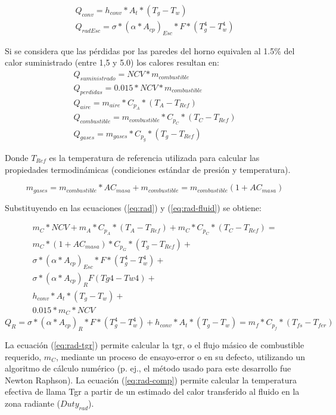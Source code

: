 \begin{gather}
    Q_{conv} = h_{conv} * A_t * (T_g - T_w)\\
    Q_{radEsc} = \sigma * ( \alpha * A_{cp} )_{Esc} * F * ( T_{g}^{4} - T_{w}^{4} )
\end{gather}

\par Si se considera que las pérdidas por las paredes del horno equivalen al 1.5\% del calor suministrado (entre 1,5 y 5.0) los calores resultan en:
\begin{gather}
    Q_{suministrado} = NCV * m_{combustible}\\
    Q_{perdidas} = 0.015 * NCV * m_{combustible}\\
    Q_{aire} = m_{aire} * C_{p_A} * (T_A - T_{Ref})\\
    Q_{combustible} = m_{combustible} * C_{p_C} * (T_C - T_{Ref})\\
    Q_{gases} = m_{gases} * C_{p_g} * (T_g - T_{Ref})
\end{gather}

\par Donde $T_{Ref}$ es la temperatura de referencia utilizada para calcular las propiedades termodinámicas (condiciones estándar de presión y temperatura).

\begin{equation}
    m_{gases} = m_{combustible} * AC_{masa} + m_{combustible} = 
    m_{combustible} (1 + AC_{masa})
\end{equation}

Substituyendo  en las ecuaciones (\ref{eq:rad}) y (\ref{eq:rad-fluid}) se obtiene:

\begin{equation}\label{eq:rad-tgr}
\begin{gathered}
    m_C*NCV +m_A*C_{p_A}*(T_A -T_{Ref}) + m_C*C_{p_C}*(T_C -T_{Ref}) = \\
    m_C*(1 +AC_{masa})*C_{p_G}*(T_g -T_{Ref}) + \\
    \sigma *(\alpha *A_{cp})_{Esc}*F*(T_g^4-T_w^4) + \\
    \sigma *(\alpha *A_{cp})_R F (Tg4 - Tw4) + \\
    h_{conv}*A_t*(T_g -T_w) + \\
    0.015*m_C*NCV
\end{gathered}
\end{equation}
\begin{equation}
\label{eq:rad-comp}
Q_R = 
\sigma * (\alpha * A_{cp})_R *F *(T_g^4 -T_w^4) +h_{conv} *A_t *(T_g -T_w)
= m_f * C_{p_f} * (T_{fs} - T_{fer})
\end{equation}
\par La ecuación (\ref{eq:rad-tgr}) permite calcular la \ac{tgr}, o el flujo másico de combustible requerido, $m_C$, mediante un proceso de ensayo-error o en su defecto, utilizando un algoritmo de cálculo numérico (p. ej., el método usado para este desarrollo fue Newton Raphson). La ecuación (\ref{eq:rad-comp}) permite calcular la  temperatura efectiva de llama Tgr a partir de un estimado del calor transferido al fluido en la zona radiante ($Duty_{rad}$).

